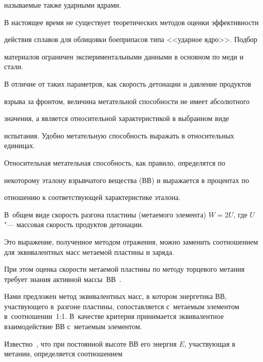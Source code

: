 называемые также ударными ядрами.



В настоящее время не существует теоретических методов оценки эффективности

действия сплавов для облицовки боеприпасов типа <<ударное ядро>>. Подбор

материалов ограничен экспериментальными данными в основном по меди и стали.



В отличие от таких параметров, как скорость детонации и давление продуктов

взрыва за фронтом, величина метательной способности не имеет абсолютного

значения, а является относительной характеристикой в выбранном виде

испытания. Удобно метательную способность выражать в относительных единицах.

Относительная метательная способность, как правило, определятся по

некоторому эталону взрывчатого вещества (ВВ) и выражается в процентах по

отношению к соответствующей характеристике эталона.



\smallskip


В~общем виде \cite{reut1:bib1} скорость разгона пластины (метаемого элемента) $W= 2U$, где $U$ "--- массовая скорость продуктов детонации. 

Это выражение, полученное методом отражения, можно заменить соотношением для эквивалентных масс метаемой пластины и заряда.

При этом оценка скорости метаемой пластины по методу торцевого метания требует знания активной массы~ВВ~\cite{reut1:bib2}.



Нами предложен метод эквивалентных масс, в котором энергетика ВВ, участвующего в~разгоне пластины, сопоставляется с~метаемым элементом в~соотношении~1:1. В~качестве критерия принимается эквивалентное взаимодействие ВВ с~метаемым элементом.



Известно~\cite{reut1:bib9}, что при постоянной  высоте ВВ его энергия $E$, участвующая в метании, определяется соотношением

$$

